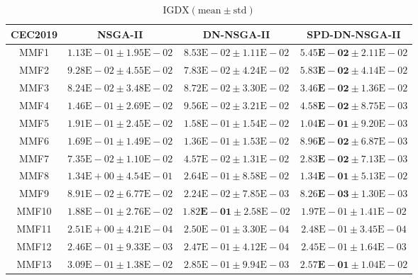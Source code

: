 \begin{table}[htbp]
	\scriptsize
	\centering
	\caption{$\text{IGDX} (\text{mean} \pm \text{std})$}\label{tab: IGDX}
	\begin{tabular}{cccc}
		\toprule
		CEC2019 & NSGA-II & DN-NSGA-II & SPD-DN-NSGA-II \\
		\midrule
		MMF1 & $1.13\text{E}-01 \pm 1.95\text{E}-02$ & $8.53\text{E}-02 \pm 1.11\text{E}-02$ & $\mathbf{5.45\text{E}-02} \pm 2.11\text{E}-02$\\
		MMF2 & $9.28\text{E}-02 \pm 4.55\text{E}-02$ & $7.83\text{E}-02 \pm 4.24\text{E}-02$ & $\mathbf{5.83\text{E}-02} \pm 4.14\text{E}-02$\\
		MMF3 & $8.24\text{E}-02 \pm 3.48\text{E}-02$ & $8.72\text{E}-02 \pm 3.30\text{E}-02$ & $\mathbf{3.46\text{E}-02} \pm 1.36\text{E}-02$\\
		MMF4 & $1.46\text{E}-01 \pm 2.69\text{E}-02$ & $9.56\text{E}-02 \pm 3.21\text{E}-02$ & $\mathbf{4.58\text{E}-02} \pm 8.75\text{E}-03$\\
		MMF5 & $1.91\text{E}-01 \pm 2.45\text{E}-02$ & $1.58\text{E}-01 \pm 1.54\text{E}-02$ & $\mathbf{1.04\text{E}-01} \pm 9.20\text{E}-03$\\
		MMF6 & $1.69\text{E}-01 \pm 1.49\text{E}-02$ & $1.36\text{E}-01 \pm 1.53\text{E}-02$ & $\mathbf{8.96\text{E}-02} \pm 6.87\text{E}-03$\\
		MMF7 & $7.35\text{E}-02 \pm 1.10\text{E}-02$ & $4.57\text{E}-02 \pm 1.31\text{E}-02$ & $\mathbf{2.83\text{E}-02} \pm 7.13\text{E}-03$\\
		MMF8 & $1.34\text{E}+00 \pm 4.54\text{E}-01$ & $2.64\text{E}-01 \pm 8.58\text{E}-02$ & $\mathbf{1.34\text{E}-01} \pm 5.13\text{E}-02$\\
		MMF9 & $8.91\text{E}-02 \pm 6.77\text{E}-02$ & $2.24\text{E}-02 \pm 7.85\text{E}-03$ & $\mathbf{8.26\text{E}-03} \pm 1.30\text{E}-03$\\
		MMF10 & $1.88\text{E}-01 \pm 2.76\text{E}-02$ & $\mathbf{1.82\text{E}-01} \pm 2.58\text{E}-02$ & $1.97\text{E}-01 \pm 1.41\text{E}-02$\\
		MMF11 & $2.51\text{E}+00 \pm 4.21\text{E}-04$ & $2.50\text{E}-01 \pm 3.30\text{E}-04$ & ${2.48\text{E}-01} \pm 3.45\text{E}-04$\\
		MMF12 & $2.46\text{E}-01 \pm 9.33\text{E}-03$ & $2.47\text{E}-01 \pm 4.12\text{E}-04$ & ${2.45\text{E}-01} \pm 1.64\text{E}-03$\\
		MMF13 & $3.09\text{E}-01 \pm 1.38\text{E}-02$ & $2.85\text{E}-01 \pm 9.94\text{E}-03$ & $\mathbf{2.57\text{E}-01} \pm 1.04\text{E}-02$\\

\end{tabular}
\end{table}
